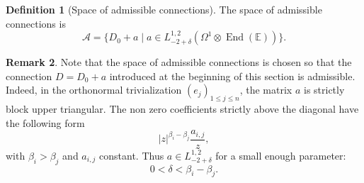 \documentclass[JEP,XML,SOM,NoEqCountersInSection,Unicode,published]{cedram}
\theoremstyle{definition}
\newtheorem{definition}{Definition}[section]
\newtheorem{remark}[definition]{Remark}
\theoremstyle{plain}
\DeclareMathOperator{\End}{End}
\begin{document}
\begin{definition}[Space of admissible connections]\label{def_admissible_connections_loc}
The space of admissible connections is
\[
\mathcal{A} =\lbrace D_0+a \mid a \in L^{1,2}_{-2+\delta}(\Omega^1\otimes \End (\mathbb{E}))\rbrace.
\]
\end{definition}
\begin{remark}
Note that the space of admissible connections is chosen so that the connection $D=D_0+a$ introduced at the beginning of this section is admissible. Indeed, in the orthonormal trivialization $\left(e_j\right)_{1\le j \le n}$, the matrix $a$ is strictly block upper triangular. The non zero coefficients strictly above the diagonal have the following form
\[
|z|^{\beta_i-\beta_j} \frac{a_{i,j}}{z},
\]
with $\beta_i > \beta_j$ and $a_{i,j}$ constant. Thus $a\in L^{1,2}_{-2+\delta}$ for a small enough parameter:
\[
0<\delta < \beta_i-\beta_j.
\]
\end{remark}
\end{document}

